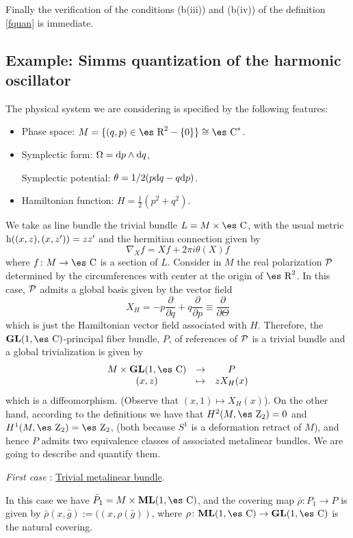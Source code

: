 \documentclass[12pt]{article}
\theoremstyle{plain}
\def\derpar#1#2{\frac{\partial{#1}}{\partial{#2}}}
\def\qed{\ifvmode\removelastskip\fi
{\unskip\nobreak\hfil\penalty50\hbox{}\nobreak\hfil
\hbox{\vrule height1.2ex width1.2ex}\parfillskip=0pt
\finalhyphendemerits=0 \par\smallskip}}
\def\d{{\rm d}}
\def\h{{\rm h}}
\def\Zahl{\mbox{\es Z}}
\def\Real{\mbox{\es R}}
\def\Complex{\mbox{\es C}}
\begin{document}
Finally the verification of the conditions (b(iii)) and (b(iv)) of the
definition \ref{fquan}
is immediate.
\qed



\subsection{Example: Simms quantization of the harmonic oscillator}


The physical system we are considering is specified by the following
features:
\begin{itemize}
\item
Phase space:
$M = \{ (q,p) \in \Real^2-\{ 0 \} \} \cong \Complex^*$.
\item
Symplectic form:
$\Omega = \d p \wedge \d q$,

Symplectic potential:
$\theta = 1/2 (p \d q - q \d p)$.
\item
Hamiltonian function:
$H = \frac{1}{2} (p^2 + q^2)$.
\end{itemize}
We take as line bundle the trivial bundle $L=M \times \Complex$,
with the usual metric $\h ((x,z),(x,z'))=zz'$
and the hermitian connection given by
$$
\nabla_Xf = Xf+2\pi i \theta(X)f
$$
where $f \colon M \to \Complex$ is a section of $L$.
Consider in $M$ the real polarization ${\cal P}$ determined by the
circumferences
with center at the origin of $\Real^2$. In this case, ${\cal P}$
admits a global basis given by the vector field
$$
X_H = -p\derpar{}{q} +q\derpar{}{p} \equiv \derpar{}{\Theta}
$$
which is just the Hamiltonian vector field associated with $H$.
Therefore, the ${\bf GL}(1,\Complex )$-principal fiber bundle, $P$,
of references of ${\cal P}$ is a trivial bundle and a global
trivialization is given by
$$
\begin{array}{ccc}
M \times {\bf GL}(1,\Complex ) & \rightarrow & P
\\
(x,z) & \mapsto & z X_H(x)
\end{array}
$$
which is a diffeomorphism. (Observe that $(x,1) \mapsto X_H(x)$).
On the other hand, according to the definitions we have that
$H^2(M,\Zahl_2)=0$ and $H^1(M,\Zahl_2)=\Zahl_2$,
(both because $S^1$ is a deformation retract of $M$),
and hence $P$ admits two equivalence classes of
associated metalinear bundles.
We are going to describe and quantify them.

{\it First case \/}: \underline{Trivial metalinear bundle}.

In this case we have $\bar P_1 = M \times {\bf ML}(1,\Complex )$,
and the covering map $\bar \rho \colon P_1 \to P$
is given by $\bar \rho (x,\bar g) := ((x,\rho (\bar g))$,
where $\rho \colon {\bf ML}(1,\Complex ) \to {\bf GL}(1,\Complex )$
is the natural covering.
\end{document}
